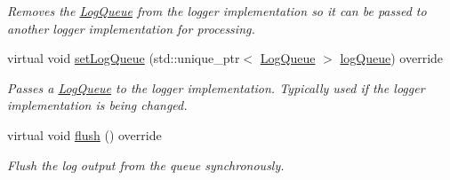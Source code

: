 \begin{DoxyCompactItemize}
\begin{DoxyCompactList}\small\item\em Removes the \hyperlink{class_aws_1_1_iot_1_1_device_client_1_1_logging_1_1_log_queue}{Log\+Queue} from the logger implementation so it can be passed to another logger implementation for processing. \end{DoxyCompactList}\item 
virtual void \hyperlink{class_aws_1_1_iot_1_1_device_client_1_1_logging_1_1_file_logger_a42b047d2f2379638add126414690d65d}{set\+Log\+Queue} (std\+::unique\+\_\+ptr$<$ \hyperlink{class_aws_1_1_iot_1_1_device_client_1_1_logging_1_1_log_queue}{Log\+Queue} $>$ \hyperlink{class_aws_1_1_iot_1_1_device_client_1_1_logging_1_1_file_logger_a9d9cf4cb8c016d0f364bbf182e41c1fe}{log\+Queue}) override
\begin{DoxyCompactList}\small\item\em Passes a \hyperlink{class_aws_1_1_iot_1_1_device_client_1_1_logging_1_1_log_queue}{Log\+Queue} to the logger implementation. Typically used if the logger implementation is being changed. \end{DoxyCompactList}\item 
virtual void \hyperlink{class_aws_1_1_iot_1_1_device_client_1_1_logging_1_1_file_logger_a507513cb4aca226a5ed6da292bfd915a}{flush} () override
\begin{DoxyCompactList}\small\item\em Flush the log output from the queue synchronously. \end{DoxyCompactList}\end{DoxyCompactItemize}
